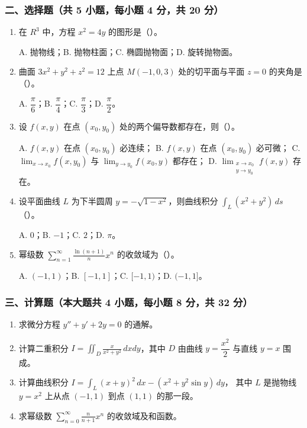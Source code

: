 \subsubsection*{二、选择题（共 5 小题，每小题 4 分，共 20 分）}
\begin{enumerate}
  \item 在 $R^3$ 中，方程 $x^2=4y$ 的图形是（\quad）。

  A. 抛物线；\quad B. 抛物柱面；\quad C. 椭圆抛物面；\quad D. 旋转抛物面。

  \item 曲面 $3x^2+y^2+z^2=12$ 上点 $M(-1,0,3)$ 处的切平面与平面 $z=0$ 的夹角是（\quad）。

  A. $\dfrac{\pi}{6}$；\quad B. $\dfrac{\pi}{4}$；\quad C. $\dfrac{\pi}{3}$；\quad D. $\dfrac{\pi}{2}$。

  \item 设 $f(x,y)$ 在点 $(x_0,y_0)$ 处的两个偏导数都存在，则（\quad）。

  A. $f(x,y)$ 在点 $(x_0,y_0)$ 必连续；\quad
  B. $f(x,y)$ 在点 $(x_0,y_0)$ 必可微；\quad
  C. $\displaystyle\lim_{x\to x_0}f(x,y_0)$ 与 $\displaystyle\lim_{y\to y_0}f(x_0,y)$ 都存在；\quad
  D. $\displaystyle\lim_{\substack{x\to x_0\\y\to y_0}}f(x,y)$ 存在。

  \item 设平面曲线 $L$ 为下半圆周 $y=-\sqrt{1-x^2}$，则曲线积分 $\displaystyle\int_L(x^2+y^2)\,ds$（\quad）。

  A. $0$；\quad B. $-1$；\quad C. $2$；\quad D. $\pi$。

  \item 幂级数 $\displaystyle\sum_{n=1}^{\infty}\frac{\ln(n+1)}{n}x^n$ 的收敛域为（\quad）。

  A. $(-1,1)$；\quad B. $[-1,1]$；\quad C. $[-1,1)$；\quad D. $(-1,1]$。
\end{enumerate}

\subsubsection*{三、计算题（本大题共 4 小题，每小题 8 分，共 32 分）}
\begin{enumerate}
  \item 求微分方程 $y''+y'+2y=0$ 的通解。
  \item 计算二重积分 $\displaystyle I=\iint_D\frac{x}{x^2+y^2}\,dxdy$，其中 $D$ 由曲线 $y=\dfrac{x^2}{2}$ 与直线 $y=x$ 围成。
  \item 计算曲线积分 \(\displaystyle I=\int_L (x+y)^2\,dx-(x^2+y^2\sin y)\,dy\)，
  其中 $L$ 是抛物线 $y=x^2$ 上从点 $(-1,1)$ 到点 $(1,1)$ 的那一段。
  \item 求幂级数 $\displaystyle\sum_{n=0}^{\infty}\frac{n}{n+1}x^n$ 的收敛域及和函数。
\end{enumerate}

